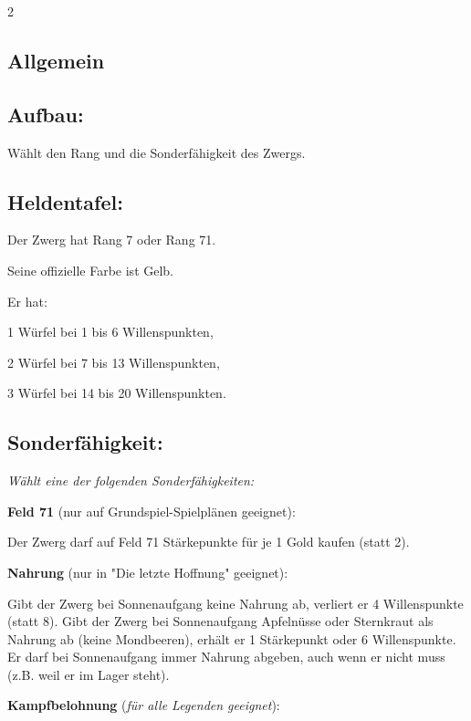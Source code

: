\documentclass[10pt, a4paper, oneside]{book}
\newcommand{\fan}[1]{\textit{#1}}
\begin{document}
\begin{multicols*}{2}\raggedcolumns


\begin{nobgcolor}

\section{Allgemein}


\subsection{Aufbau:}

Wählt den Rang und die Sonderfähigkeit des Zwergs.


\subsection{Heldentafel:}

Der Zwerg hat Rang 7 oder Rang 71.

Seine offizielle Farbe ist Gelb.

Er hat:

\bullet{} 1 Würfel bei 1 bis 6 Willenspunkten,

\bullet{} 2 Würfel bei 7 bis 13 Willenspunkten,

\bullet{} 3 Würfel bei 14 bis 20 Willenspunkten.



\subsection{Sonderfähigkeit:}

\fan{Wählt eine der folgenden Sonderfähigkeiten:}

\bullet{} \textbf{Feld 71} (nur auf Grundspiel-Spielplänen geeignet):

Der Zwerg darf auf Feld 71 Stärkepunkte für je 1 Gold kaufen (statt 2).

\bullet{} \textbf{Nahrung} (nur in "Die letzte Hoffnung" geeignet):

Gibt der Zwerg bei Sonnenaufgang keine Nahrung ab, verliert er 4 Willenspunkte (statt 8). Gibt der Zwerg bei Sonnenaufgang Apfelnüsse oder Sternkraut als Nahrung ab (keine Mondbeeren\supercite{MH:Mondbeeren,MH:Begleitheft}), erhält er 1 Stärkepunkt oder 6 Willenspunkte. Er darf bei Sonnenaufgang immer Nahrung abgeben, auch wenn er nicht muss (z.B. weil er im Lager steht).
\supercite{DlH15:k_4}

\bullet{} \textbf{Kampfbelohnung} (\fan{für alle Legenden geeignet}):


\end{nobgcolor}
\end{multicols*}
\end{document}
